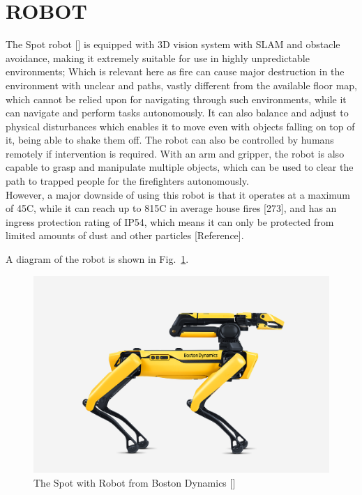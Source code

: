 \section{ROBOT}\label{Sec:method}

The Spot robot [] is equipped with 3D vision system with SLAM and obstacle avoidance, making it extremely suitable for use in highly unpredictable environments; Which is relevant here as fire can cause major destruction in the environment with unclear and paths, vastly different from the available floor map, which cannot be relied upon for navigating through such environments, while it can navigate and perform tasks autonomously. It can also balance and adjust to physical disturbances which enables it to move even with objects falling on top of it, being able to shake them off. The robot can also be controlled by humans remotely if intervention is required. With an arm and gripper, the robot is also capable to grasp and manipulate multiple objects, which can be used to clear the path to trapped people for the firefighters autonomously. \\

However, a major downside of using this robot is that it operates at a maximum of 45\degree C, while it can reach up to 815\degree C in average house fires [273], and has an ingress protection rating of IP54, which means it can only be protected from limited amounts of dust and other particles [Reference]. 

A diagram of the robot is shown in Fig.~\ref{Fig:spot_arm}.

\begin{figure}[ht!]
  \centering
  \includegraphics[scale=0.15]{figures/spot_arm.png}
  \caption{The Spot with Robot from Boston Dynamics []}
  \label{Fig:spot_arm}
\end{figure}

\\